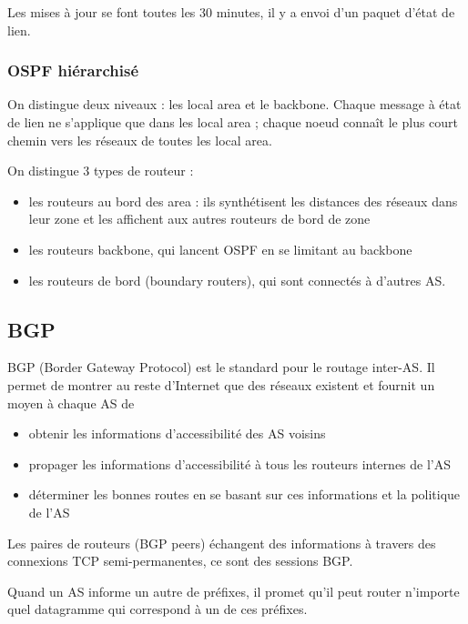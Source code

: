 	Les mises à jour se font toutes les 30 minutes, il y a envoi d'un paquet d'état de lien.
	
		\subsubsection{OSPF hiérarchisé}
		
		
		On distingue deux niveaux : les local area et le backbone. Chaque message à état de lien ne s'applique que dans les local area ; chaque noeud connaît le plus court chemin vers les réseaux de toutes les local area.
		
		On distingue 3 types de routeur :
		
		\begin{itemize}
			\item les routeurs au bord des area : ils synthétisent les distances des réseaux dans leur zone et les affichent aux autres routeurs de bord de zone
			\item les routeurs backbone, qui lancent OSPF en se limitant au backbone
			\item les routeurs de bord (boundary routers), qui sont connectés à d'autres AS.
		\end{itemize}
	
	\subsection{BGP}
	
	BGP (Border Gateway Protocol) est le standard pour le routage inter-AS. Il permet de montrer au reste d'Internet que des réseaux existent et fournit un moyen à chaque AS de
	
	\begin{itemize}
		\item obtenir les informations d'accessibilité des AS voisins
		\item propager les informations d'accessibilité à tous les routeurs internes de l'AS
		\item déterminer les bonnes routes en se basant sur ces informations et la politique de l'AS
	\end{itemize}
	
	Les paires de routeurs (BGP peers) échangent des informations à travers des connexions TCP semi-permanentes, ce sont des sessions BGP.
	

	Quand un AS informe un autre de préfixes, il promet qu'il peut router n'importe quel datagramme qui correspond à un de ces préfixes. 
	
